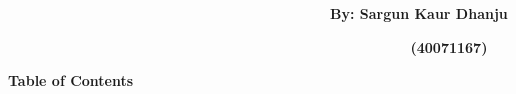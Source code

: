 \documentclass[12pt]{article}
\begin{document}
\vspace{\baselineskip}
\begin{justify}
{\fontsize{16pt}{19.2pt}\selectfont \textbf{\ \ \ \ \ \ \ \ \ \ \ \ \ \ \ \ \ \ \ \ \ \ \ \ \ \ \ \ \ \ \ \ \ \ \ \ \ \ \ \  By: Sargun Kaur Dhanju}\par}
\end{justify}\par

\begin{justify}
{\fontsize{16pt}{19.2pt}\selectfont \textbf{\ \ \ \ \ \ \ \ \ \ \ \ \ \ \ \ \ \ \ \ \ \ \ \ \ \ \ \ \ \ \ \ \ \ \ \ \ \ \ \ \ \ \ \ \ \ \ \ \ \  (40071167)}\par}
\end{justify}\par


\vspace{\baselineskip}

\vspace{\baselineskip}

\vspace{\baselineskip}

\vspace{\baselineskip}

\vspace{\baselineskip}

\vspace{\baselineskip}

\vspace{\baselineskip}

\vspace{\baselineskip}

\vspace{\baselineskip}

\vspace{\baselineskip}

\vspace{\baselineskip}

\vspace{\baselineskip}

\vspace{\baselineskip}

\vspace{\baselineskip}

\vspace{\baselineskip}
\begin{justify}
{\fontsize{14pt}{16.8pt}\selectfont \textbf{Table of Contents}\par}
\end{justify}\par
\end{document}
